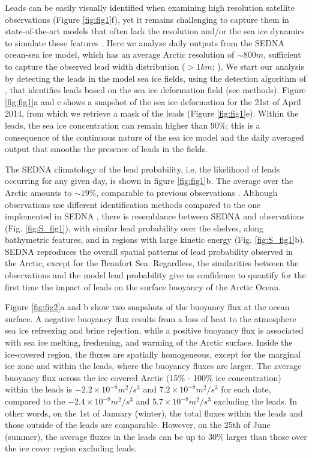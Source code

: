 \documentclass[lineno,sn-basic]{sn-jnl}%
\begin{document}
Leads can be easily visually identified when examining high resolution satellite observations (Figure \ref{fig:fig1}f), yet it remains challenging to capture them in state-of-the-art models that often lack the resolution and/or the sea ice dynamics to simulate these features \citep{Bouchat_sea_ice_rheology_2022, Wang_leads_2016}. Here we analyze daily outputs from the SEDNA ocean-sea ice model, which has an average Arctic resolution of $\sim 800m$, sufficient to capture the observed lead width distribution ($>1km$; \citealp{Wernecke_Lead_2015}). 
We start our analysis by detecting the leads in the model sea ice fields, using the detection algorithm of \citet{Hutter_identification_2019}, that identifies leads based on the sea ice deformation field (see methods). Figure \ref{fig:fig1}a and c shows a snapshot of the sea ice deformation for the 21st of April 2014, from which we retrieve a mask of the leads (Figure \ref{fig:fig1}e). Within the leads, the sea ice concentration can remain higher than 90\%; this is a consequence of the continuous nature of the sea ice model and the daily averaged output that smooths the presence of leads in the fields.

The SEDNA climatology of the lead probability, i.e. the likelihood of leads occurring for any given day, is shown in figure \ref{fig:fig1}b. The average over the Arctic amounts to $\sim 19\%$, comparable to previous observations \citep{Wernecke_Lead_2015,Willmes_leads_currents_2023}. Although observations use different identification methods compared to the one implemented in SEDNA \citep{Hutter_identification_2019}, there is resemblance between SEDNA and observations (Fig. \ref{fig:S_fig1}), with similar lead probability over the shelves, along bathymetric features, and in regions with large kinetic energy (Fig. \ref{fig:S_fig1}b). SEDNA reproduces the overall spatial patterns of lead probability observed in the Arctic, except for the Beaufort Sea. Regardless, the similarities between the observations and the model lead probability give us confidence to quantify for the first time the impact of leads on the surface buoyancy of the Arctic Ocean.

Figure \ref{fig:fig2}a and b show two snapshots of the buoyancy flux at the ocean surface. A negative buoyancy flux results from a loss of heat to the atmosphere sea ice refreezing and brine rejection, while a positive buoyancy flux is associated with sea ice melting, freshening, and warming of the Arctic surface. Inside the ice-covered region, the fluxes are spatially homogeneous, except for the marginal ice zone and within the leads, where the buoyancy fluxes are larger. The average buoyancy flux across the ice covered Arctic (15\% - 100\% ice concentration) within the leads is $-2.2\times 10^{-8} m^2/s^3$ and $7.2\times 10^{-8} m^2/s^3$ for each date, compared to the $-2.4\times 10^{-8} m^2/s^3$ and $5.7\times 10^{-8} m^2/s^3$ excluding the leads. In other words, on the 1st of January (winter), the total fluxes within the leads and those outside of the leads are comparable. However, on the 25th of June (summer), the average fluxes in the leads can be up to 30\% larger than those over the ice cover region excluding leads.
\end{document}
